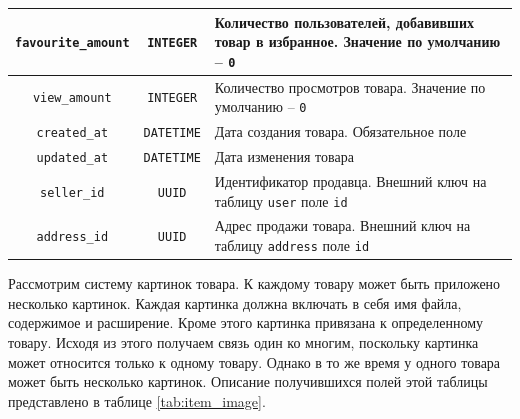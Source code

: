 \documentclass[a4paper,14pt]{extarticle}
\begin{document}
\begin{center}
\begin{longtable}{|c|c|>{\centering\arraybackslash}m{7.5cm}|}
        \hline
        \texttt{favourite\_amount}   & \texttt{INTEGER}      & Количество пользователей, добавивших товар в избранное. Значение по умолчанию -- \texttt{0}                                                                                           \\
        \hline
        \texttt{view\_amount}        & \texttt{INTEGER}      & Количество просмотров товара. Значение по умолчанию -- \texttt{0}                                                                                                                     \\
        \hline
        \texttt{created\_at}         & \texttt{DATETIME}     & Дата создания товара. Обязательное поле                                                                                                                                               \\
        \hline
        \texttt{updated\_at}         & \texttt{DATETIME}     & Дата изменения товара                                                                                                                                                                 \\
        \hline
        \texttt{seller\_id}          & \texttt{UUID}         & Идентификатор продавца. Внешний ключ на таблицу \texttt{user} поле \texttt{id}                                                                                                        \\
        \hline
        \texttt{address\_id}         & \texttt{UUID}         & Адрес продажи товара. Внешний ключ на таблицу \texttt{address} поле \texttt{id}                                                                                                       \\
        \hline
    \end{longtable}
\end{center}

Рассмотрим систему картинок товара. К каждому товару может быть приложено несколько картинок. Каждая картинка должна включать в себя имя файла, содержимое и расширение. Кроме этого картинка привязана к определенному товару. Исходя из этого получаем связь один ко многим, поскольку картинка может относится только к одному товару. Однако в то же время у одного товара может быть несколько картинок. Описание получившихся полей этой таблицы представлено в таблице \ref{tab:item_image}.
\end{document}
